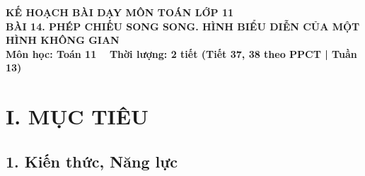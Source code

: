 \documentclass[12pt, a4paper]{article}
\begin{document}
\begin{center}
    {\fontsize{14pt}{17pt}\selectfont \textbf{KẾ HOẠCH BÀI DẠY MÔN TOÁN LỚP 11}}\\[6pt]
    {\fontsize{16pt}{19pt}\selectfont \textbf{BÀI 14. PHÉP CHIẾU SONG SONG. HÌNH BIỂU DIỄN CỦA MỘT HÌNH KHÔNG GIAN}}\\[4pt]
    {\fontsize{12pt}{15pt}\selectfont \textbf{Môn học: Toán 11} \ \textbar \ \textbf{Thời lượng: 2 tiết (Tiết 37, 38 theo PPCT | Tuần 13)}}
\end{center}

\vspace{5pt}

\section*{I. MỤC TIÊU}

\subsection*{1. Kiến thức, Năng lực}
\end{document}
